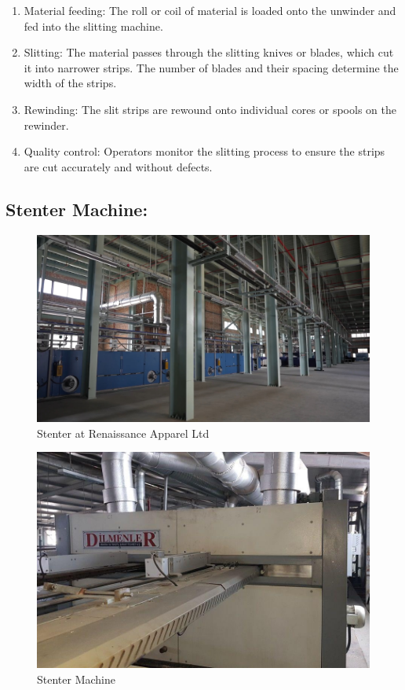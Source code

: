 \begin{enumerate}
\item
  Material feeding: The roll or coil of material is loaded onto the
  unwinder and fed into the slitting machine.
\item
  Slitting: The material passes through the slitting knives or blades,
  which cut it into narrower strips. The number of blades and their
  spacing determine the width of the strips.
\item
  Rewinding: The slit strips are rewound onto individual cores or spools
  on the rewinder.
\item
  Quality control: Operators monitor the slitting process to ensure the
  strips are cut accurately and without defects.
\end{enumerate}


\subsection{Stenter Machine:\cite{stenter_machine}}

\begin{figure}[h!]
  \centering
  \includegraphics[width=0.8\linewidth]{figs/stenter.jpg}
  \caption{Stenter at Renaissance Apparel Ltd}
  \label{fig:stenter}
\end{figure}

\begin{figure}[h!]
  \centering
  \includegraphics[width=0.8\linewidth]{figs/production/image3.jpg}
  \caption{Stenter Machine}
  \label{fig:Stenter Machine}
\end{figure}

